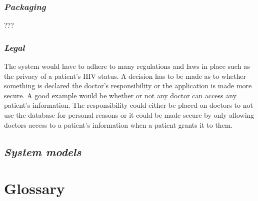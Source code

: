 \documentclass[a4paper]{article}
\begin{document}
	\subsubsection{\textit{Packaging}}
	???
	
	\subsubsection{\textit{Legal}}
	The system would have to adhere to many regulations and laws in place such as the privacy of a patient's HIV status. A decision has to be made as to whether something is declared the doctor's responsibility or the application is made more secure. A good example would be whether or not any doctor can access any patient's information. The responsibility could either be placed on doctors to not use the database for personal reasons or it could be made secure by only allowing doctors access to a patient's information when a patient grants it to them.
		
\subsection{\textit{System models}}

\newpage

\section{Glossary}
\end{document}
